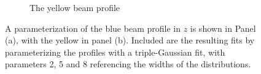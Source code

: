 \begin{figure}
\begin{subfigure}[b]{0.8\textwidth}
    \caption{The yellow beam profile}
  \end{subfigure}
  \caption{
    A parameterization of the blue beam profile in $z$ is shown in Panel (a),
    with the yellow in panel (b). Included are the resulting fits by
    parameterizing the profiles with a triple-Gaussian fit, with parameters 2, 5
    and 8 referencing the widths of the distributions.
  }
  \label{fig:z_profile}
\end{figure}
